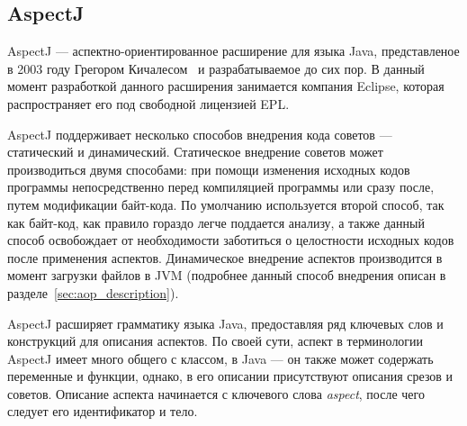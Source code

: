\subsection{AspectJ}
\label{sub:aspectj_overwiev}

AspectJ --- аспектно-ориентированное расширение для языка Java, представленое в
2003 году Грегором Кичалесом~\cite{kiczales_aspectj} и разрабатываемое до сих
пор.
В данный момент разработкой данного расширения занимается компания Eclipse,
которая распространяет его под свободной лицензией EPL.

AspectJ поддерживает несколько способов внедрения кода советов --- статический и
динамический.
Статическое внедрение советов может производиться двумя способами: при помощи
изменения исходных кодов программы непосредственно перед компиляцией программы
или сразу после, путем модификации байт-кода.
По умолчанию используется второй способ, так как байт-код, как правило гораздо
легче поддается анализу, а также данный способ освобождает от необходимости
заботиться о целостности исходных кодов после применения аспектов.
Динамическое внедрение аспектов производится в момент загрузки файлов в JVM
(подробнее данный способ внедрения описан в разделе~\ref{sec:aop_description}).

AspectJ расширяет грамматику языка Java, предоставляя ряд ключевых слов и
конструкций для описания аспектов.
По своей сути, аспект в терминологии AspectJ имеет много общего с классом, в
Java --- он также может содержать переменные и функции, однако, в его описании
присутствуют описания срезов и советов.
Описание аспекта начинается с ключевого слова \textit{aspect}, после чего
следует его идентификатор и тело.

